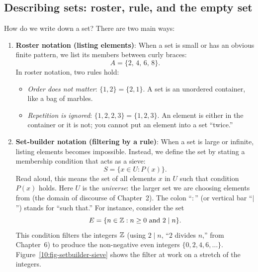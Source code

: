 \subsection{Describing sets: roster, rule, and the empty set}

How do we write down a set? There are two main ways:

\begin{enumerate}
\item \textbf{Roster notation (listing elements)}: When a set is small or has an obvious finite pattern, we list its members between curly braces:
\[
A = \{2, \, 4, \, 6, \, 8\}.
\]
In roster notation, two rules hold:
\begin{itemize}
\item \emph{Order does not matter}: $\{1, 2\} = \{2, 1\}$. A set is an unordered container, like a bag of marbles.
\item \emph{Repetition is ignored}: $\{1, 2, 2, 3\} = \{1, 2, 3\}$. An element is either in the container or it is not; you cannot put an element into a set ``twice.''
\end{itemize}

\item \textbf{Set-builder notation (filtering by a rule)}: When a set is large or infinite, listing elements becomes impossible. Instead, we define the set by stating a membership condition that acts as a sieve:
\[
S = \{x \in U : P(x)\}.
\]
Read aloud, this means the set of all elements $x$ in $U$ such that condition $P(x)$ holds. Here $U$ is the \emph{universe}: the larger set we are choosing elements from (the domain of discourse of Chapter~2). The colon ``$:$'' (or vertical bar ``$\mid$'') stands for ``such that.'' For instance, consider the set
\[
E = \{n \in \mathbb{Z} : n \ge 0 \text{ and } 2 \mid n\}.
\]
This condition filters the integers $\mathbb{Z}$ (using $2 \mid n$, ``$2$ divides $n$,'' from Chapter~6) to produce the non-negative even integers $\{0, 2, 4, 6, \dots\}$. Figure~\ref{10:fig-setbuilder-sieve} shows the filter at work on a stretch of the integers.
\end{enumerate}

